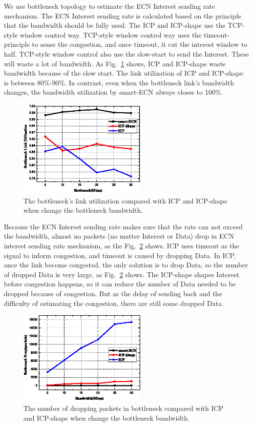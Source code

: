 We use bottleneck topology to estimate the ECN Interest sending rate mechanism. The ECN Interest sending rate is calculated based on the principle that the bandwidth should be fully used. The ICP and ICP-shape use the TCP-style window control way. TCP-style window control way uses the timeout-principle to sense the congestion, and once timeout, it cut the interest window to half. TCP-style window control also use the slow-start to send the Interest. These will waste a lot of bandwidth. As Fig.~\ref{fig-linkuti} shows, ICP and ICP-shape waste bandwidth because of the slow start. The link utilization of ICP and ICP-shape is between 80\%-90\%. In contrast, even when the bottleneck link's bandwidth changes, the bandwidth utilization by smart-ECN always closes to 100\%.

\begin{figure}[t]
	\centering
	\includegraphics[width=2.5in]{utilization-pic-cut.eps}
	\caption{The bottleneck's link utilization compared with ICP and ICP-shape when change the bottleneck bandwidth.}
	\label{fig-linkuti}
\end{figure}

Because the ECN Interest sending rate makes sure that the rate can not exceed the bandwidth, almost no packets (no matter Interest or Data) drop in ECN interest sending rate mechanism, as the Fig.~\ref{fig-drop} shows. ICP uses timeout as the signal to inform congestion, and timeout is caused by dropping Data. In ICP, once the link become congested, the only solution is to drop Data, so the number of dropped Data is very large, as Fig.~\ref{fig-drop} shows. The ICP-shape shapes Interest before congestion happens, so it can reduce the number of Data needed to be dropped because of congestion. But as the delay of sending back and the difficulty of estimating the congestion, there are still some dropped Data.

\begin{figure}[t]
	\centering
	\includegraphics[width=2.5in]{drop-pic-cut.eps}
	\caption{The number of dropping packets in bottleneck compared with ICP and ICP-shape when change the bottleneck bandwidth.}
	\label{fig-drop}
\end{figure}

